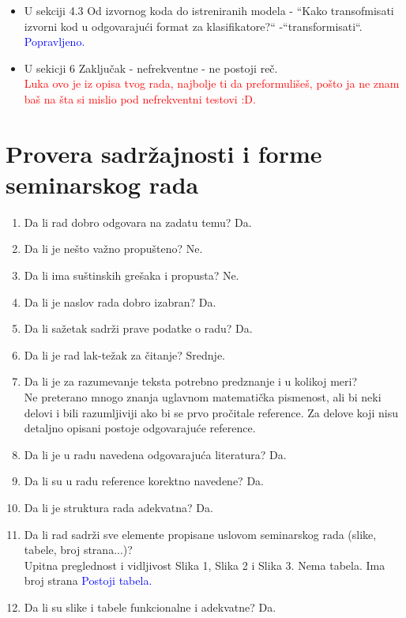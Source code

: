 \documentclass[a4paper]{report}
\newcommand{\odgovor}[1]{\textcolor{blue}{#1}}
\newcommand{\todo}[1]{\textcolor{red}{#1}}
\begin{document}
\begin{itemize}
   \item U sekciji 4.3 Od izvornog koda do istreniranih modela - ``Kako transofmisati izvorni kod u odgovarajući format za klasifikatore?`` -``transformisati``.
   \\\odgovor{Popravljeno.}

   \item U sekicji 6 Zaključak - nefrekventne - ne postoji reč.
   \\\todo{Luka ovo je iz opisa tvog rada, najbolje ti da preformulišeš, pošto ja ne znam baš na šta si mislio pod nefrekventni testovi :D.}
\end{itemize}


\section{Provera sadržajnosti i forme seminarskog rada}

\begin{enumerate}
\item Da li rad dobro odgovara na zadatu temu? Da.\\
\item Da li je nešto važno propušteno? Ne.\\
\item Da li ima suštinskih grešaka i propusta? Ne.\\
\item Da li je naslov rada dobro izabran? Da.\\
\item Da li sažetak sadrži prave podatke o radu?  Da.\\
\item Da li je rad lak-težak za čitanje?  Srednje.\\
\item Da li je za razumevanje teksta potrebno predznanje i u kolikoj meri?\\ Ne
preterano mnogo znanja uglavnom matematička pismenost, ali bi neki delovi i bili razumljiviji ako bi se prvo pročitale reference. Za
delove koji nisu detaljno opisani postoje odgovarajuće reference.\\
\item Da li je u radu navedena odgovarajuća literatura?  Da.\\
\item Da li su u radu reference korektno navedene?  Da.\\
\item Da li je struktura rada adekvatna?  Da.\\
\item Da li rad sadrži sve elemente propisane uslovom seminarskog rada (slike, tabele, broj strana...)?\\
Upitna preglednost i vidljivost Slika 1, Slika 2 i Slika 3. Nema tabela. Ima broj strana    \odgovor{Postoji tabela.} \\
\item Da li su slike i tabele funkcionalne i adekvatne? Da.\\
\end{enumerate}
\end{document}
